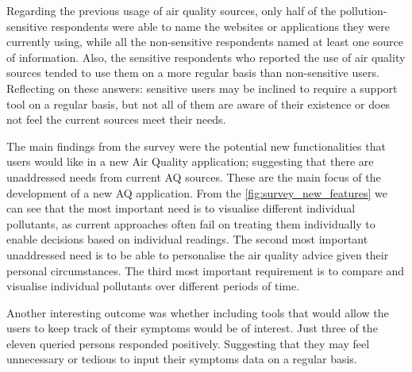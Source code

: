 Regarding the previous usage of air quality sources, only half of the pollution-sensitive respondents were able to name the websites or applications they were currently using, while all the non-sensitive respondents named at least one source of information. Also, the sensitive respondents who reported the use of air quality sources tended to use them on a more regular basis than non-sensitive users. Reflecting on these answers: sensitive users may be inclined to require a support tool on a regular basis, but not all of them are aware of their existence or does not feel the current sources meet their needs. 

The main findings from the survey were the potential new functionalities that users would like in a new Air Quality application; suggesting that there are unaddressed needs from current AQ sources. These are the main focus of the development of a new AQ application. From the \ref{fig:survey_new_features} we can see that the most important need is to visualise different individual pollutants, as current approaches often fail on treating them individually to enable decisions based on individual readings. The second most important unaddressed need is to be able to personalise the air quality advice given their personal circumstances. The third most important requirement is to compare and visualise individual pollutants over different periods of time. 

Another interesting outcome was whether including tools that would allow the users to keep track of their symptoms would be of interest. Just three of the eleven queried persons responded positively. Suggesting that they may feel unnecessary or tedious to input their symptoms data on a regular basis.


